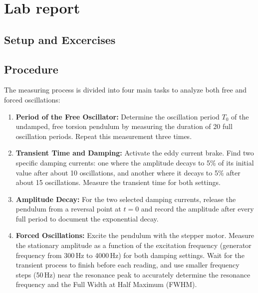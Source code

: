 \documentclass[12pt,a4paper,titlepage]{scrartcl}
\numberwithin{equation}{section}
\numberwithin{table}{section}
\numberwithin{figure}{section}
\begin{document}
\section{Lab report}

\subsection{Setup and Excercises}

    




\subsection{Procedure}
The measuring process is divided into four main tasks to analyze both free and forced oscillations:

\begin{enumerate}
    \item \textbf{Period of the Free Oscillator:} Determine the oscillation period $T_0$ of the undamped, free torsion pendulum by measuring the duration of 20 full oscillation periods. Repeat this measurement three times.
    \item \textbf{Transient Time and Damping:} Activate the eddy current brake. Find two specific damping currents: one where the amplitude decays to 5\% of its initial value after about 10 oscillations, and another where it decays to 5\% after about 15 oscillations. Measure the transient time for both settings.
    \item \textbf{Amplitude Decay:} For the two selected damping currents, release the pendulum from a reversal point at $t=0$ and record the amplitude after every full period to document the exponential decay.
    \item \textbf{Forced Oscillations:} Excite the pendulum with the stepper motor. Measure the stationary amplitude as a function of the excitation frequency (generator frequency from 300\,Hz to 4000\,Hz) for both damping settings. Wait for the transient process to finish before each reading, and use smaller frequency steps (50\,Hz) near the resonance peak to accurately determine the resonance frequency and the Full Width at Half Maximum (FWHM).
\end{enumerate}
\end{document}
